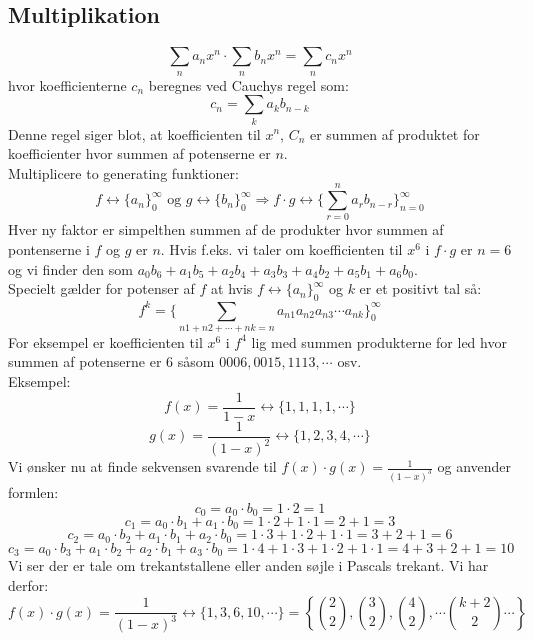 \subsection*{Multiplikation}
\[\sum_{n}a_{n}x^{n} \cdot \sum_{n}b_{n}x^{n}=\sum_{n}c_{n}x^{n}\]
hvor koefficienterne \(c_{n}\) beregnes ved Cauchys regel som:
\[c_{n}=\sum_{k}a_{k}b_{n-k}\]
Denne regel siger blot, at koefficienten til \(x^{n}\), \(C_{n}\) er summen af produktet for koefficienter hvor summen af potenserne er \(n\).\\
Multiplicere to generating funktioner:
\[f \leftrightarrow \{a_{n}\}_{0}^{\infty} \text{  og  } g \leftrightarrow \{b_{n}\}_{0}^{\infty} \Rightarrow f \cdot g \leftrightarrow \{\sum_{r=0}^{n}a_{r}b_{n-r}\}_{n=0}^{\infty}\]
Hver ny faktor er simpelthen summen af de produkter hvor summen af pontenserne i \(f\) og \(g\) er \(n\). Hvis f.eks. vi taler om koefficienten til \(x^{6}\) i \(f \cdot g\) er \(n=6\) og vi finder den som \(a_{0}b_{6}+ a_{1}b_{5}+ a_{2}b_{4}+ a_{3}b_{3}+ a_{4}b_{2}+ a_{5}b_{1}+ a_{6}b_{0}\).\\
Specielt gælder for potenser af \(f\) at hvis \(f \leftrightarrow \{a_{n}\}_{0}^{\infty}\) og \(k\) er et positivt tal så:
\[f^{k}=\{\sum_{n1+n2+ \dotsm +nk=n}a_{n1}a_{n2}a_{n3} \dotsm a_{nk}\}_{0}^{\infty}\]
For eksempel er koefficienten til \(x^{6}\) i \(f^{4}\) lig med summen produkterne for led hvor summen af potenserne er \(6\) såsom \(0006,0015,1113, \dotsm \) osv.\\
Eksempel:
\[f(x)=\frac{1}{1-x} \leftrightarrow \{1,1,1,1, \dotsm\}\]
\[g(x)=\frac{1}{(1-x)^{2}} \leftrightarrow \{1,2,3,4, \dotsm \}\]
Vi ønsker nu at finde sekvensen svarende til \(f(x) \cdot g(x)=\frac{1}{(1-x)^{3}} \) og anvender formlen:
\[c_{0}=a_{0}\cdot b_{0}=1 \cdot 2 = 1\]
\[c_{1}=a_{0} \cdot b_{1}+a_{1} \cdot b_{0}=1 \cdot 2+1 \cdot 1 =2+1=3\]
\[c_{2}=a_{0} \cdot b_{2}+a_{1} \cdot b_{1}+a_{2} \cdot b_{0}=1 \cdot 3+1 \cdot 2+1 \cdot 1=3+2+1=6\]
\[c_{3}=a_{0} \cdot b_{3}+a_{1} \cdot b_{2}+a_{2} \cdot b_{1}+a_{3} \cdot b_{0}=1 \cdot 4+1 \cdot 3+1 \cdot 2+1 \cdot 1=4+3+2+1=10\]
Vi ser der er tale om trekantstallene eller anden søjle i Pascals trekant. Vi har derfor:
\[f(x) \cdot g(x)=\frac{1}{(1-x)^{3}} \leftrightarrow \{1,3,6,10, \dotsm\}=\left\{\binom{2}{2},\binom{3}{2},\binom{4}{2}, \dotsm \binom{k+2}{2} \dotsm \right\}\]
